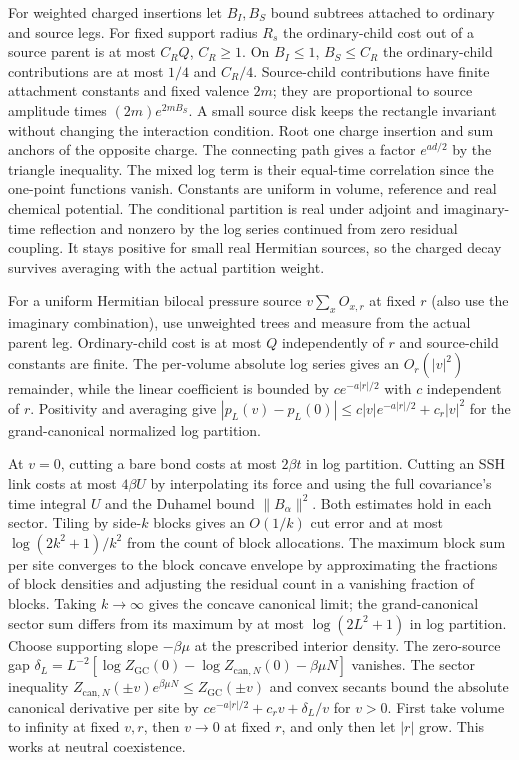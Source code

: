 \documentclass[11pt]{article}
\begin{document}
For weighted charged insertions let $B_I,B_S$ bound subtrees attached to ordinary and source legs. For fixed support radius $R_s$ the ordinary-child cost out of a source parent is at most $C_R Q$, $C_R\ge1$. On $B_I\le1$, $B_S\le C_R$ the ordinary-child contributions are at most $1/4$ and $C_R/4$. Source-child contributions have finite attachment constants and fixed valence $2m$; they are proportional to source amplitude times $(2m)e^{2m B_S}$. A small source disk keeps the rectangle invariant without changing the interaction condition. Root one charge insertion and sum anchors of the opposite charge. The connecting path gives a factor $e^{a d/2}$ by the triangle inequality. The mixed log term is their equal-time correlation since the one-point functions vanish. Constants are uniform in volume, reference and real chemical potential. The conditional partition is real under adjoint and imaginary-time reflection and nonzero by the log series continued from zero residual coupling. It stays positive for small real Hermitian sources, so the charged decay survives averaging with the actual partition weight.

For a uniform Hermitian bilocal pressure source $v\sum_x O_{x,r}$ at fixed $r$ (also use the imaginary combination), use unweighted trees and measure from the actual parent leg. Ordinary-child cost is at most $Q$ independently of $r$ and source-child constants are finite. The per-volume absolute log series gives an $O_r(|v|^2)$ remainder, while the linear coefficient is bounded by $c e^{-a|r|/2}$ with $c$ independent of $r$. Positivity and averaging give $|p_L(v)-p_L(0)|\le c|v|e^{-a|r|/2}+c_r |v|^2$ for the grand-canonical normalized log partition.

At $v=0$, cutting a bare bond costs at most $2\beta t$ in log partition. Cutting an SSH link costs at most $4\beta U$ by interpolating its force and using the full covariance's time integral $U$ and the Duhamel bound $\|B_\alpha\|^2$. Both estimates hold in each sector. Tiling by side-$k$ blocks gives an $O(1/k)$ cut error and at most $\log(2k^2+1)/k^2$ from the count of block allocations. The maximum block sum per site converges to the block concave envelope by approximating the fractions of block densities and adjusting the residual count in a vanishing fraction of blocks. Taking $k\to\infty$ gives the concave canonical limit; the grand-canonical sector sum differs from its maximum by at most $\log(2L^2+1)$ in log partition. Choose supporting slope $-\beta\mu$ at the prescribed interior density. The zero-source gap $\delta_L=L^{-2}[\log Z_{\mathrm{GC}}(0)-\log Z_{\mathrm{can},N}(0)-\beta\mu N]$ vanishes. The sector inequality $Z_{\mathrm{can},N}(\pm v)e^{\beta\mu N}\le Z_{\mathrm{GC}}(\pm v)$ and convex secants bound the absolute canonical derivative per site by $c e^{-a|r|/2}+c_r v+\delta_L/v$ for $v>0$. First take volume to infinity at fixed $v,r$, then $v\to0$ at fixed $r$, and only then let $|r|$ grow. This works at neutral coexistence.
\end{document}
